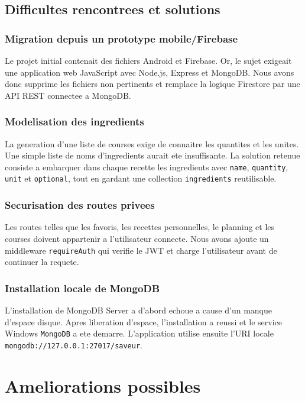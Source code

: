 \documentclass[12pt,a4paper]{report}
\begin{document}
\section{Difficultes rencontrees et solutions}

\subsection{Migration depuis un prototype mobile/Firebase}

Le projet initial contenait des fichiers Android et Firebase. Or, le sujet exigeait une application web JavaScript avec Node.js, Express et MongoDB. Nous avons donc supprime les fichiers non pertinents et remplace la logique Firestore par une API REST connectee a MongoDB.

\subsection{Modelisation des ingredients}

La generation d'une liste de courses exige de connaitre les quantites et les unites. Une simple liste de noms d'ingredients aurait ete insuffisante. La solution retenue consiste a embarquer dans chaque recette les ingredients avec \texttt{name}, \texttt{quantity}, \texttt{unit} et \texttt{optional}, tout en gardant une collection \texttt{ingredients} reutilisable.

\subsection{Securisation des routes privees}

Les routes telles que les favoris, les recettes personnelles, le planning et les courses doivent appartenir a l'utilisateur connecte. Nous avons ajoute un middleware \texttt{requireAuth} qui verifie le JWT et charge l'utilisateur avant de continuer la requete.

\subsection{Installation locale de MongoDB}

L'installation de MongoDB Server a d'abord echoue a cause d'un manque d'espace disque. Apres liberation d'espace, l'installation a reussi et le service Windows \texttt{MongoDB} a ete demarre. L'application utilise ensuite l'URI locale \texttt{mongodb://127.0.0.1:27017/saveur}.

\chapter{Ameliorations possibles}
\end{document}
